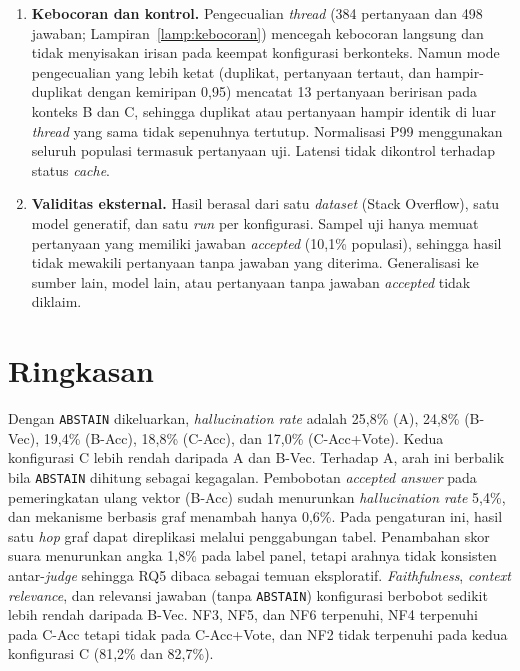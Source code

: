 \begin{enumerate}
    \item \textbf{Kebocoran dan kontrol.} Pengecualian \emph{thread} (384 pertanyaan dan 498 jawaban; Lampiran~\ref{lamp:kebocoran}) mencegah kebocoran langsung dan tidak menyisakan irisan pada keempat konfigurasi berkonteks. Namun mode pengecualian yang lebih ketat (duplikat, pertanyaan tertaut, dan hampir-duplikat dengan kemiripan 0,95) mencatat 13 pertanyaan beririsan pada konteks B dan C, sehingga duplikat atau pertanyaan hampir identik di luar \emph{thread} yang sama tidak sepenuhnya tertutup. Normalisasi P99 menggunakan seluruh populasi termasuk pertanyaan uji. Latensi tidak dikontrol terhadap status \emph{cache}.

    \item \textbf{Validitas eksternal.} Hasil berasal dari satu \emph{dataset} (Stack Overflow), satu model generatif, dan satu \emph{run} per konfigurasi. Sampel uji hanya memuat pertanyaan yang memiliki jawaban \emph{accepted} (10,1\% populasi), sehingga hasil tidak mewakili pertanyaan tanpa jawaban yang diterima. Generalisasi ke sumber lain, model lain, atau pertanyaan tanpa jawaban \emph{accepted} tidak diklaim.
\end{enumerate}

\section{Ringkasan}
\label{sec:ringkasan-evaluasi}

Dengan \texttt{ABSTAIN} dikeluarkan, \emph{hallucination rate} adalah 25,8\% (A), 24,8\% (B-Vec), 19,4\% (B-Acc), 18,8\% (C-Acc), dan 17,0\% (C-Acc+Vote). Kedua konfigurasi C lebih rendah daripada A dan B-Vec. Terhadap A, arah ini berbalik bila \texttt{ABSTAIN} dihitung sebagai kegagalan. Pembobotan \emph{accepted answer} pada pemeringkatan ulang vektor (B-Acc) sudah menurunkan \emph{hallucination rate} 5,4\%, dan mekanisme berbasis graf menambah hanya 0,6\%. Pada pengaturan ini, hasil satu \emph{hop} graf dapat direplikasi melalui penggabungan tabel. Penambahan skor suara menurunkan angka 1,8\% pada label panel, tetapi arahnya tidak konsisten antar-\emph{judge} sehingga RQ5 dibaca sebagai temuan eksploratif. \emph{Faithfulness}, \emph{context relevance}, dan relevansi jawaban (tanpa \texttt{ABSTAIN}) konfigurasi berbobot sedikit lebih rendah daripada B-Vec. NF3, NF5, dan NF6 terpenuhi, NF4 terpenuhi pada C-Acc tetapi tidak pada C-Acc+Vote, dan NF2 tidak terpenuhi pada kedua konfigurasi C (81,2\% dan 82,7\%).